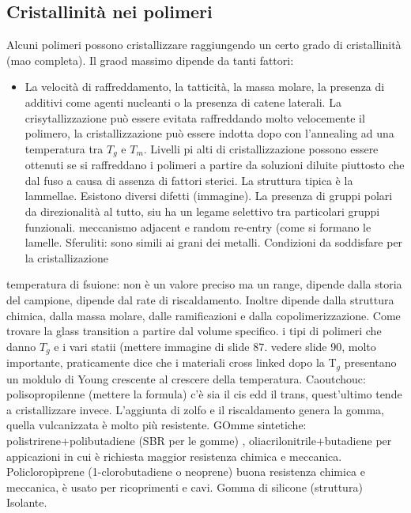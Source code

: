     \subsection{Cristallinità nei polimeri}
    Alcuni polimeri possono cristallizzare raggiungendo un certo grado di cristallinità (mao completa). Il graod massimo dipende da tanti fattori:
    \begin{itemize}
        \item La velocità di raffreddamento, la tatticità, la massa molare, la presenza di additivi come agenti nucleanti o la presenza di catene laterali. La crisytallizzazione può essere evitata raffreddando molto velocemente il polimero, la cristallizzazione può essere indotta dopo con l'annealing ad una temperatura tra $T_g$ e $T_m$. Livelli pi alti di cristallizzazione possono essere ottenuti se si raffreddano i polimeri a partire da soluzioni diluite piuttosto che dal fuso a causa di assenza di fattori sterici. La struttura tipica è la lammellae. Esistono diversi difetti (immagine). La presenza di gruppi polari da direzionalità al tutto, siu ha un legame selettivo tra particolari gruppi funzionali.  meccanismo adjacent e random re-entry (come si formano le lamelle. Sferuliti: sono simili ai grani dei metalli.
        Condizioni da soddisfare per la cristallizazione
    \end{itemize}
    temperatura di fsuione: non è un valore preciso ma un range, dipende dalla storia del campione, dipende dal rate di riscaldamento. Inoltre dipende dalla struttura chimica, dalla massa molare, dalle ramificazioni e dalla copolimerizzazione. Come trovare la glass transition a partire dal volume specifico. i tipi di polimeri che danno $T_g$ e i vari statii (mettere immagine di slide 87. vedere slide 90, molto importante, praticamente dice che i materiali cross linked dopo la T$_g$ presentano un moldulo di Young crescente al crescere della temperatura. Caoutchouc: polisopropilenne (mettere la formula) c'è sia il cis edd il trans, quest'ultimo tende a cristallizzare invece. L'aggiunta di zolfo e il riscaldamento genera la gomma, quella vulcanizzata è molto più resistente. GOmme sintetiche: polistrirene+polibutadiene (SBR per le gomme) , oliacrilonitrile+butadiene per appicazioni in cui è richiesta maggior resistenza chimica e meccanica. Policloropìprene (1-clorobutadiene o neoprene) buona resistenza chimica e meccanica, è usato per ricoprimenti e cavi. Gomma di silicone (struttura) Isolante.
